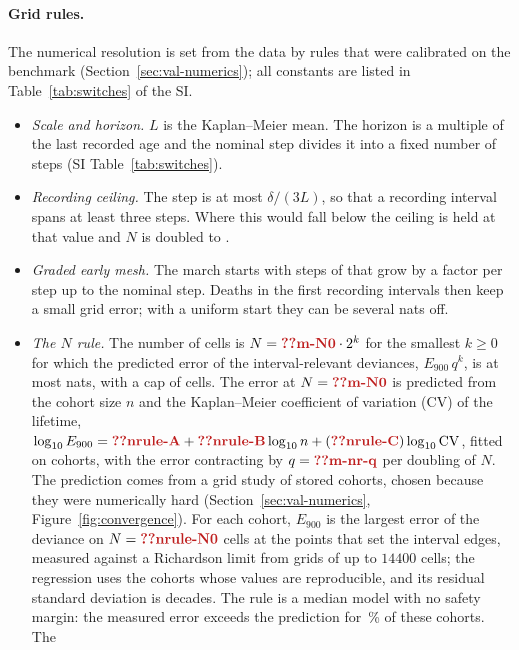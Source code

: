 \paragraph{Grid rules.} The numerical resolution is set from the data by rules that were calibrated on the benchmark
(Section~\ref{sec:val-numerics}); all constants are listed in Table~\ref{tab:switches} of the SI.
\begin{itemize}[leftmargin=1.5em,itemsep=1pt]
  \item \emph{Scale and horizon.} $L$ is the Kaplan--Meier mean. The horizon is a multiple of the last recorded age and the nominal
    step divides it into a fixed number of steps (SI Table~\ref{tab:switches}).
  \item \emph{Recording ceiling.} The step is at most $\delta/(3L)$, so that a recording interval spans at least three steps. Where this
    would fall below  the ceiling is held at that value and $N$ is doubled to .
  \item \emph{Graded early mesh.} The march starts with steps of  that grow by a factor  per step
    up to the nominal step. Deaths in the first recording intervals then keep a small grid error; with a uniform start they
    can be several nats off.
  \item \emph{The $N$ rule.} The number of cells is $N=\C{m-N0}\cdot 2^{k}$ for the smallest $k\ge0$ for which the predicted error of the
    interval-relevant deviances, $E_{900}\,q^{k}$, is at most  nats, with a cap of  cells. The error at $N=\C{m-N0}$ is
    predicted from the cohort size $n$ and the Kaplan--Meier coefficient of variation (CV) of the lifetime,
    $\log_{10}E_{900}=\C{nrule-A}+\C{nrule-B}\log_{10}n+(\C{nrule-C})\log_{10}\mathrm{CV}$, fitted on  cohorts, with the error
    contracting by $q=\C{m-nr-q}$ per doubling of $N$. The prediction comes from a grid study of  stored
    cohorts, chosen because they were numerically hard (Section~\ref{sec:val-numerics}, Figure~\ref{fig:convergence}). For
    each cohort, $E_{900}$ is the largest error of the deviance on $N=\C{nrule-N0}$ cells at the points that set the interval
    edges, measured against a Richardson limit from grids of up to $14400$ cells; the regression uses the  cohorts
    whose values are reproducible, and its residual standard deviation is  decades. The rule is a median
    model with no safety margin: the measured error exceeds the prediction for \,\% of these cohorts. The

\end{itemize}
